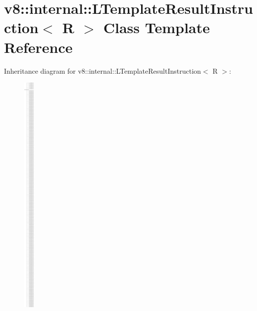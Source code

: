 \hypertarget{classv8_1_1internal_1_1_l_template_result_instruction}{}\section{v8\+:\+:internal\+:\+:L\+Template\+Result\+Instruction$<$ R $>$ Class Template Reference}
\label{classv8_1_1internal_1_1_l_template_result_instruction}
Inheritance diagram for v8\+:\+:internal\+:\+:L\+Template\+Result\+Instruction$<$ R $>$\+:\begin{figure}[H]
\begin{center}
\leavevmode
\includegraphics[height=12.000000cm]{classv8_1_1internal_1_1_l_template_result_instruction}
\end{center}
\end{figure}
